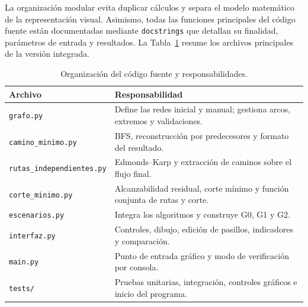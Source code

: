 \documentclass[11pt,a4paper]{article}
\begin{document}
La organización modular evita duplicar cálculos y separa el modelo matemático de la representación visual. Asimismo, todas las funciones principales del código fuente están documentadas mediante \texttt{docstrings} que detallan su finalidad, parámetros de entrada y resultados. La Tabla~\ref{tab:modulos} resume los archivos principales de la versión integrada.
\begin{table}[H]
\centering\small
\caption{Organización del código fuente y responsabilidades.}\label{tab:modulos}
\begin{tabularx}{\textwidth}{>{\raggedright\arraybackslash}p{4.5cm}X}
\toprule
Archivo & Responsabilidad \\
\midrule
\texttt{grafo.py} & Define las redes inicial y manual; gestiona arcos, extremos y validaciones.\\
\texttt{camino\_minimo.py} & BFS, reconstrucción por predecesores y formato del resultado.\\
\texttt{rutas\_independientes.py} & Edmonds--Karp y extracción de caminos sobre el flujo final.\\
\texttt{corte\_minimo.py} & Alcanzabilidad residual, corte mínimo y función conjunta de rutas y corte.\\
\texttt{escenarios.py} & Integra los algoritmos y construye G0, G1 y G2.\\
\texttt{interfaz.py} & Controles, dibujo, edición de pasillos, indicadores y comparación.\\
\texttt{main.py} & Punto de entrada gráfico y modo de verificación por consola.\\
\texttt{tests/} & Pruebas unitarias, integración, controles gráficos e inicio del programa.\\
\bottomrule
\end{tabularx}
\end{table}
\end{document}
